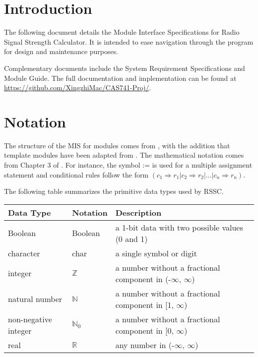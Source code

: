 \documentclass[12pt, titlepage]{article}
\begin{document}

\section{Introduction}

The following document details the Module Interface Specifications for
Radio Signal Strength Calculator. It is intended to ease navigation through 
the program for design and maintenance purposes.

Complementary documents include the System Requirement Specifications
and Module Guide.  The full documentation and implementation can be
found at \url{https://github.com/XingzhiMac/CAS741-Proj/}. 

\section{Notation}

The structure of the MIS for modules comes from \citet{HoffmanAndStrooper1995},
with the addition that template modules have been adapted from
\cite{GhezziEtAl2003}.  The mathematical notation comes from Chapter 3 of
\citet{HoffmanAndStrooper1995}.  For instance, the symbol := is used for a
multiple assignment statement and conditional rules follow the form $(c_1
\Rightarrow r_1 | c_2 \Rightarrow r_2 | ... | c_n \Rightarrow r_n )$.

The following table summarizes the primitive data types used by RSSC. 

\begin{center}
\renewcommand{\arraystretch}{1.2}
\noindent 
\begin{tabular}{l l p{7.5cm}} 
\toprule 
\textbf{Data Type} & \textbf{Notation} & \textbf{Description}\\ 
\midrule
Boolean & Boolean & a 1-bit data with two possible values (0 and 1)\\
character & char & a single symbol or digit\\
integer & $\mathbb{Z}$ & a number without a fractional component in (-$\infty$, $\infty$) \\
natural number & $\mathbb{N}$ & a number without a fractional component in [1, $\infty$) \\
non-negative integer & $\mathbb{N}_0$ & a number without a fractional component in [0, $\infty$) \\
real & $\mathbb{R}$ & any number in (-$\infty$, $\infty$)\\

\bottomrule
\end{tabular} 
\end{center}
\end{document}
